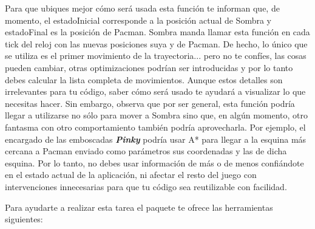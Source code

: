 Para que ubiques mejor cómo será usada esta función te informan que, de momento, el estadoInicial corresponde a la posición actual de Sombra y estadoFinal es la posición de Pacman.  Sombra manda llamar esta función en cada tick del reloj con las nuevas posiciones suya y de Pacman.  De hecho, lo único que se utiliza es el primer movimiento de la trayectoria... pero no te confíes, las cosas pueden cambiar, otras optimizaciones podrían ser introducidas y por lo tanto debes calcular la lista completa de movimientos.  Aunque estos detalles son irrelevantes para tu código, saber cómo será usado te ayudará a visualizar lo que necesitas hacer.  Sin embargo, observa que por ser general, esta función podría llegar a utilizarse no sólo para mover a Sombra sino que, en algún momento, otro fantasma con otro comportamiento también podría aprovecharla.  Por ejemplo, el encargado de las emboscadas \textbf{\textit{Pinky}} podría usar A* para llegar a la esquina más cercana a Pacman enviado como parámetros sus coordenadas y las de dicha esquina.  Por lo tanto, no debes usar información de más o de menos confiándote en el estado actual de la aplicación, ni afectar el resto del juego con intervenciones innecesarias para que tu código sea reutilizable con facilidad.

Para ayudarte a realizar esta tarea el paquete te ofrece las herramientas siguientes:

